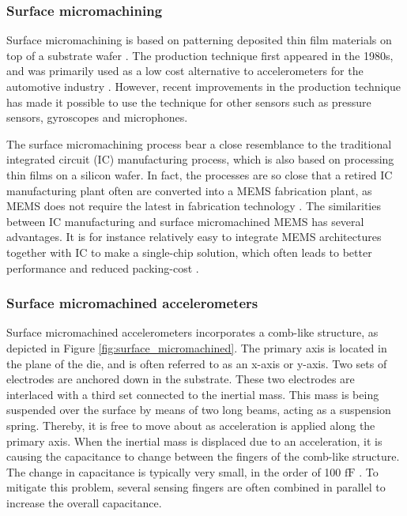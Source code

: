 \subsubsection{Surface micromachining}

Surface micromachining is based on patterning deposited thin film materials on top of a substrate wafer \cite[p.~5]{kaajakari09}. The production technique first appeared in the 1980s, and was primarily used as a low cost alternative to accelerometers for the automotive industry \cite[p.~101]{maluf04}. However, recent improvements in the production technique has made it possible to use the technique for other sensors such as pressure sensors, gyroscopes and microphones. 

The surface micromachining process bear a close resemblance to the traditional integrated circuit (IC) manufacturing process, which is also based on processing thin films on a silicon wafer. In fact, the processes are so close that a retired IC manufacturing plant often are converted into a MEMS fabrication plant, as MEMS does not require the latest in fabrication technology \cite[p.~4]{kaajakari09}. The similarities between IC manufacturing and surface micromachined MEMS has several advantages. It is for instance relatively easy to integrate MEMS architectures together with IC to make a single-chip solution, which often leads to better performance and reduced packing-cost \cite{mcube_fact_sheet}. 

\subsubsection{Surface micromachined accelerometers}

Surface micromachined accelerometers incorporates a comb-like structure, as depicted in Figure \ref{fig:surface_micromachined}. The primary axis is located in the plane of the die, and is often referred to as an x-axis or y-axis. Two sets of electrodes are anchored down in the substrate. These two electrodes are interlaced with a third set connected to the inertial mass. This mass is being suspended over the surface by means of two long beams, acting as a suspension spring. Thereby, it is free to move about as acceleration is applied along the primary axis. When the inertial mass is displaced due to an acceleration, it is causing the capacitance to change between the fingers of the comb-like structure. The change in capacitance is typically very small, in the order of 100 $\si{\femto\farad}$ \cite[p.~101]{maluf04}. To mitigate this problem, several sensing fingers are often combined in parallel to increase the overall capacitance.

